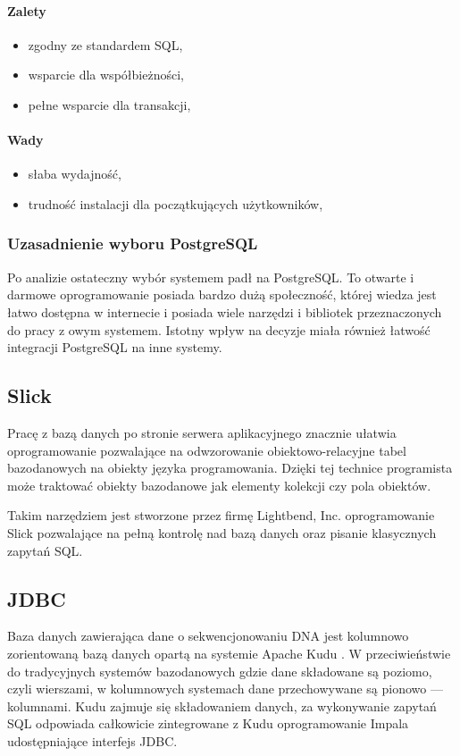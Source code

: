 \documentclass[a4paper,12pt,twoside]{article}
\begin{document}
\paragraph{Zalety}
\begin{itemize}
\item{zgodny ze standardem SQL},
\item{wsparcie dla współbieżności},
\item{pełne wsparcie dla transakcji},
\end{itemize}
\paragraph{Wady}
\begin{itemize}
\item{słaba wydajność},
\item{trudność instalacji dla początkujących użytkowników},
\end{itemize}

\subsubsection{Uzasadnienie wyboru PostgreSQL}
Po analizie ostateczny wybór systemem padł na PostgreSQL.
To otwarte i darmowe oprogramowanie posiada bardzo dużą społeczność, której wiedza jest łatwo dostępna w internecie
i posiada wiele narzędzi i bibliotek przeznaczonych do pracy z owym systemem.
Istotny wpływ na decyzje miała również łatwość integracji PostgreSQL na inne systemy.

\subsection{Slick}
Pracę z bazą danych po stronie serwera aplikacyjnego
znacznie ułatwia oprogramowanie pozwalające na odwzorowanie obiektowo-relacyjne tabel bazodanowych na obiekty języka programowania.
Dzięki tej technice programista może traktować obiekty bazodanowe jak elementy kolekcji czy pola obiektów.

Takim narzędziem jest stworzone przez firmę Lightbend, Inc.
oprogramowanie Slick\cite{slick} pozwalające na pełną kontrolę nad bazą danych oraz pisanie klasycznych zapytań SQL.

\subsection{JDBC}
Baza danych zawierająca dane o sekwencjonowaniu DNA jest kolumnowo zorientowaną bazą danych opartą na systemie Apache Kudu \cite{kudu}. W przeciwieństwie do tradycyjnych systemów bazodanowych gdzie dane składowane są poziomo, czyli wierszami, w kolumnowych systemach dane przechowywane są pionowo — kolumnami.
Kudu zajmuje się składowaniem danych, za wykonywanie zapytań SQL
odpowiada całkowicie zintegrowane z Kudu oprogramowanie Impala \cite{impala} \cite{impalaArt} udostępniające interfejs JDBC.
\end{document}
